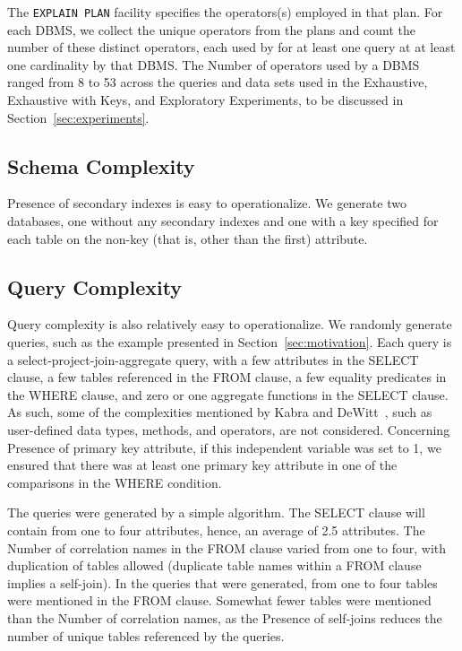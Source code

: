 \documentclass[prodmode,acmtods]{acmsmall}
\begin{document}
The {\tt EXPLAIN PLAN} facility specifies the operators(s) \hbox{employed} in that
plan. For each \hbox{DBMS}, we collect the unique operators from the plans
and count the number of these distinct operators, each used by for at least one
query at at least one cardinality by that \hbox{DBMS}. The Number of operators used
by a \hbox{DBMS} ranged from 8 to 53 across the queries and data sets
used in the Exhaustive, Exhaustive with Keys, and Exploratory Experiments,
to be discussed in Section~\ref{sec:experiments}.

\subsection{Schema Complexity}
Presence of secondary indexes is easy to operationalize. We generate two
databases, one without any secondary indexes and one with a key specified
for each table on the non-key (that is, other than the first) attribute.

\subsection{Query Complexity}\label{sec:querycomplexity}
Query complexity is also relatively easy to operationalize. We randomly generate queries,
such as the example presented in Section~\ref{sec:motivation}. Each query
is a select-project-join-aggregate query, with a few attributes in the
SELECT clause, a few tables \hbox{referenced} in the FROM clause, a few
equality predicates in the WHERE clause, and zero or one aggregate
functions in the SELECT clause. As such, some of the complexities
mentioned by Kabra and \hbox{DeWitt~\cite{kabra98},} such as
user-defined data types, methods, and operators, are not
considered. Concerning Presence of primary key attribute, if this independent
variable was set to 1, we ensured that there was at least one primary key
attribute in one of the comparisons in the WHERE condition.

The queries were generated
by a simple algorithm. 
The SELECT clause will contain from one to four
attributes, hence, an average of 2.5 attributes. The Number of
correlation names
in the FROM clause varied from one to four, with duplication of tables
allowed (duplicate table names within a FROM clause implies a self-join).
In the queries that were generated, from one to four tables were
mentioned in the FROM clause. Somewhat fewer tables were mentioned than the
Number of correlation names, as the Presence of self-joins reduces the
number of unique tables referenced by the queries.
\end{document}
